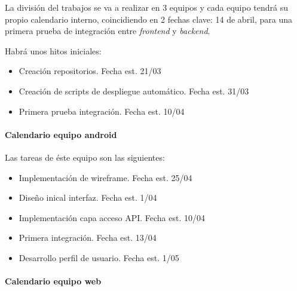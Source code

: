 \documentclass{article}
\begin{document}

La división del trabajos se va a realizar en 3 equipos y cada equipo tendrá su propio calendario interno, coincidiendo en 2 fechas clave:
14 de abril, para una primera prueba de integración entre \textit{frontend} y \textit{backend}.

Habrá unos hitos iniciales:
\begin{itemize}
    \item Creación repositorios. Fecha est. 21/03
    \item Creación de scripts de despliegue automático. Fecha est. 31/03
    \item Primera prueba integración. Fecha est. 10/04
\end{itemize}

\paragraph{Calendario equipo android}

Las tareas de éste equipo son las siguientes:
\begin{itemize}

    \item Implementación de wireframe. Fecha est. 25/04
    \item Diseño inical interfaz. Fecha est. 1/04
    \item Implementación capa acceso API. Fecha est. 10/04
    \item Primera integración. Fecha est. 13/04
    \item Desarrollo perfil de usuario. Fecha est. 1/05
\end{itemize}

\paragraph{Calendario equipo web}
\end{document}
